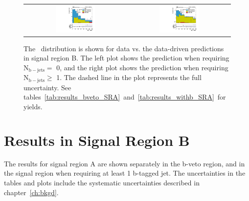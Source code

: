 \begin{figure}[!ht]
  \begin{center}
    \begin{tabular}{cc}
      \includegraphics[width=0.4\textwidth]{results/figs/SRA_bveto_MET_yield_hist.pdf} &
      \includegraphics[width=0.4\textwidth]{results/figs/SRA_withb_MET_yield_hist.pdf} \\
    \end{tabular}
    \caption{
      The \MET\ distribution is shown for data vs. the data-driven predictions in signal region B.
      The left plot shows the prediction when requiring N$\mathrm{_{b-jets}} =$ 0, and the right plot shows the prediction when requiring N$\mathrm{_{b-jets}} \geq$ 1.
      The dashed line in the plot represents the full uncertainty.
      See tables~\ref{tab:results_bveto_SRA}~and~\ref{tab:results_withb_SRA}~for yields.
      \label{fig:results_SRA}
    }
  \end{center}
\end{figure}

\clearpage

\section{Results in Signal Region B}

The results for signal region A are shown separately in the b-veto region, and in the signal region when requiring at least 1 b-tagged jet.
The uncertainties in the tables and plots include the systematic uncertainties described in chapter~\ref{ch:bkgd}.

